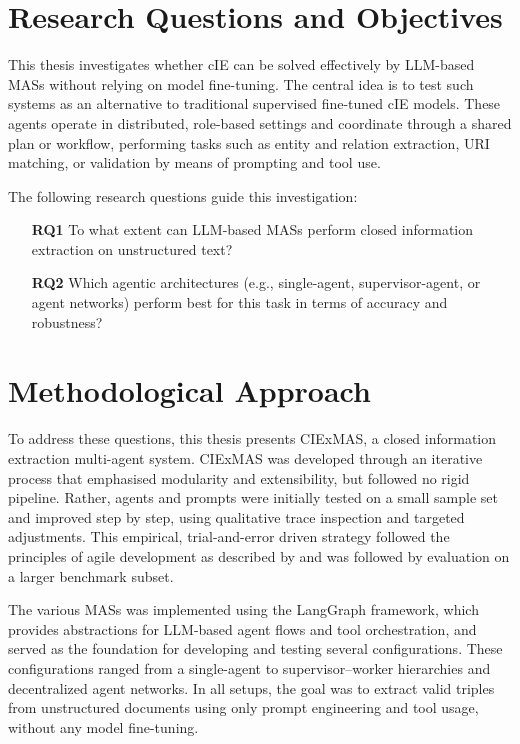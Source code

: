 \documentclass[a4paper,oneside,bibliography=totoc]{scrbook}
\begin{document}
\section{Research Questions and Objectives}
\label{sec:research_questions}

This thesis investigates whether \ac{cIE} can be solved effectively by \ac{LLM}-based \acp{MAS} without relying on model fine-tuning. The central idea is to test such systems as an alternative to traditional supervised fine-tuned \ac{cIE} models. These agents operate in distributed, role-based settings and coordinate through a shared plan or workflow, performing tasks such as entity and relation extraction, \ac{URI} matching, or validation by means of prompting and tool use.

The following research questions guide this investigation:

\begin{itemize}
  \item[\textbf{RQ1}] To what extent can \ac{LLM}-based \acp{MAS} perform closed information extraction on unstructured text?
  \item[\textbf{RQ2}] Which agentic architectures (e.g., single-agent, supervisor-agent, or agent networks) perform best for this task in terms of accuracy and robustness?
\end{itemize}

\section{Methodological Approach}
\label{sec:methodology}

To address these questions, this thesis presents CIExMAS, a closed information extraction multi-agent system. CIExMAS was developed through an iterative process that emphasised modularity and extensibility, but followed no rigid pipeline. Rather, agents and prompts were initially tested on a small sample set and improved step by step, using qualitative trace inspection and targeted adjustments. This empirical, trial-and-error driven strategy followed the principles of agile development as described by \citet{Abrahamsson2017} and was followed by evaluation on a larger benchmark subset.

The various \acp{MAS} was implemented using the LangGraph framework, which provides abstractions for \ac{LLM}-based agent flows and tool orchestration, and served as the foundation for developing and testing several configurations. These configurations ranged from a single-agent to supervisor–worker hierarchies and decentralized agent networks. In all setups, the goal was to extract valid triples from unstructured documents using only prompt engineering and tool usage, without any model fine-tuning.
\end{document}
